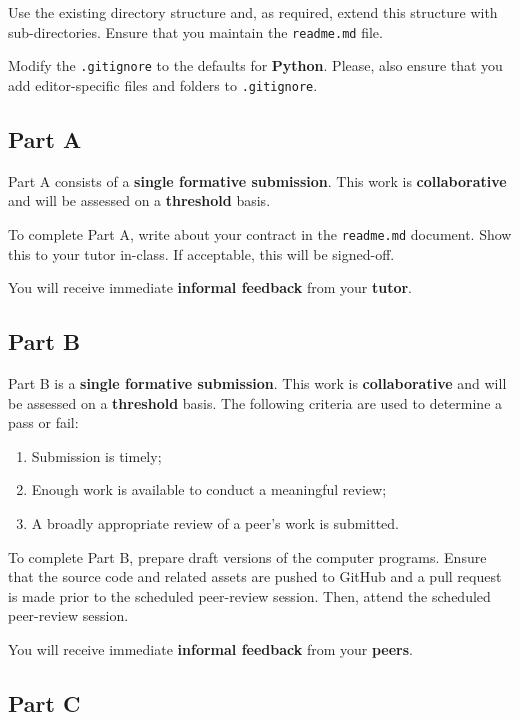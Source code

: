 \documentclass{../../fal_assignment}
\begin{document}
Use the existing directory structure and, as required, extend this structure with sub-directories. Ensure that you maintain the \texttt{readme.md} file.

Modify the \texttt{.gitignore} to the defaults for \textbf{Python}. Please, also ensure that you add editor-specific files and folders to \texttt{.gitignore}. 

\subsection*{Part A}

Part A consists of a \textbf{single formative submission}. This work is \textbf{collaborative} and will be assessed on a \textbf{threshold} basis. 

To complete Part A, write about your contract in the \texttt{readme.md} document.  Show this to your tutor in-class.  If acceptable, this will be signed-off. 

You will receive immediate \textbf{informal feedback} from your \textbf{tutor}.

\subsection*{Part B}

Part B is a \textbf{single formative submission}. This work is \textbf{collaborative} and will be assessed on a \textbf{threshold} basis. The following criteria are used to determine a pass or fail:

\begin{enumerate}[label=(\alph*)]
	\item Submission is timely;
	\item Enough work is available to conduct a meaningful review;
	\item A broadly appropriate review of a peer's work is submitted.
\end{enumerate}

To complete Part B, prepare draft versions of the computer programs. Ensure that the source code and related assets are pushed to GitHub and a pull request is made prior to the scheduled peer-review session. Then, attend the scheduled peer-review session.

You will receive immediate \textbf{informal feedback} from your \textbf{peers}.

\subsection*{Part C}
\end{document}
